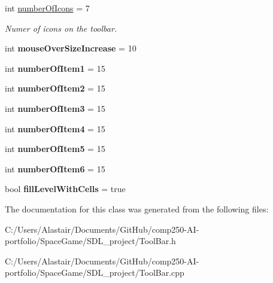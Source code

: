 \begin{DoxyCompactItemize}
\mbox{\label{class_tool_bar_ae81299dbf81245c5133a92d24041eb3e}} 
int \hyperlink{class_tool_bar_ae81299dbf81245c5133a92d24041eb3e}{number\+Of\+Icons} = 7
\begin{DoxyCompactList}\small\item\em Numer of icons on the toolbar. \end{DoxyCompactList}\item 
\mbox{\label{class_tool_bar_a829a0d2ea9ce392d5bccf8557a98a0a2}} 
int {\bfseries mouse\+Over\+Size\+Increase} = 10
\item 
\mbox{\label{class_tool_bar_a299ab8439d40b05d8739e7e395846d5f}} 
int {\bfseries number\+Of\+Item1} = 15
\item 
\mbox{\label{class_tool_bar_ab87ff8704c010de962ff509082dd6c44}} 
int {\bfseries number\+Of\+Item2} = 15
\item 
\mbox{\label{class_tool_bar_a22ebfa09c70085c77219d5e023501d98}} 
int {\bfseries number\+Of\+Item3} = 15
\item 
\mbox{\label{class_tool_bar_a23e26fbaeee1e1c76d3ca987c620d7be}} 
int {\bfseries number\+Of\+Item4} = 15
\item 
\mbox{\label{class_tool_bar_a2f1831ae41fee39b8abbec9f2682f663}} 
int {\bfseries number\+Of\+Item5} = 15
\item 
\mbox{\label{class_tool_bar_ae255e24f4e0f1194f72d8981428d5879}} 
int {\bfseries number\+Of\+Item6} = 15
\item 
\mbox{\label{class_tool_bar_a085fa326a85cf9a016d5327f048c907c}} 
bool {\bfseries fill\+Level\+With\+Cells} = true
\end{DoxyCompactItemize}


The documentation for this class was generated from the following files\+:\begin{DoxyCompactItemize}
\item 
C\+:/\+Users/\+Alastair/\+Documents/\+Git\+Hub/comp250-\/\+A\+I-\/portfolio/\+Space\+Game/\+S\+D\+L\+\_\+project/Tool\+Bar.\+h\item 
C\+:/\+Users/\+Alastair/\+Documents/\+Git\+Hub/comp250-\/\+A\+I-\/portfolio/\+Space\+Game/\+S\+D\+L\+\_\+project/Tool\+Bar.\+cpp\end{DoxyCompactItemize}
